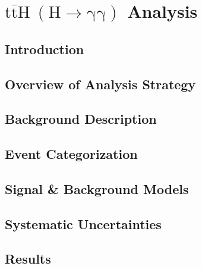 \chapter{$\mathrm{t\bar{t}H~(H \to \gamma \gamma)}$ Analysis}

\section{Introduction} \label{sec:tth_intro}


\section{Overview of Analysis Strategy} \label{sec:tth_analysis_strategy}



\section{Background Description} \label{sec:tth_background_description}

\section{Event Categorization} \label{sec:tth_event_categorization}

\section{Signal \& Background Models} \label{sec:sig_bkg_models}

\section{Systematic Uncertainties} \label{sec:tth_systematic_uncertainties}

\section{Results} \label{sec:tth_results}
